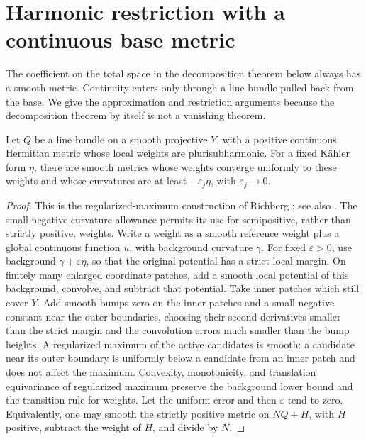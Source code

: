 \section{Harmonic restriction with a continuous base metric}\label{har:sec:harmonic}

The coefficient on the total space in the decomposition theorem below
always has a smooth metric. Continuity enters only through a line bundle
pulled back from the base. We give the approximation and restriction
arguments because the decomposition theorem by itself is not a vanishing
theorem.

\begin{lemma}\label{har:lem:smoothing}
Let \(Q\) be a line bundle on a smooth projective \(Y\), with a positive
continuous Hermitian metric whose local weights are plurisubharmonic.
For a fixed Kähler form \(\eta\), there are smooth metrics whose weights
converge uniformly to these weights and whose curvatures are at least
\(-\varepsilon_j\eta\), with \(\varepsilon_j\to0\).
\end{lemma}

\begin{proof}
This is the regularized-maximum construction of Richberg
\cite{Richberg1968}; see also \cite[Theorem~I.5.21]{Demailly2012}. The small negative curvature allowance permits its
use for semipositive, rather than strictly positive, weights. Write a
weight as a smooth reference weight plus a global continuous function
\(u\), with background curvature \(\gamma\). For fixed \(\varepsilon>0\),
use background \(\gamma+\varepsilon\eta\), so that the original potential
has a strict local margin. On finitely many enlarged coordinate patches,
add a smooth local potential of this background, convolve, and subtract
that potential. Take inner patches which still cover \(Y\). Add smooth
bumps zero on the inner patches and a small negative constant near the
outer boundaries, choosing their second derivatives smaller than the
strict margin and the convolution errors much smaller than the bump
heights. A regularized maximum of the active candidates is smooth: a
candidate near its outer boundary is uniformly below a candidate from
an inner patch and does not affect the maximum. Convexity, monotonicity,
and translation equivariance of regularized maximum preserve the
background lower bound and the transition rule for weights. Let the
uniform error and then \(\varepsilon\) tend to zero. Equivalently, one
may smooth the strictly positive metric on \(NQ+H\), with \(H\) positive,
subtract the weight of \(H\), and divide by \(N\).
\end{proof}

